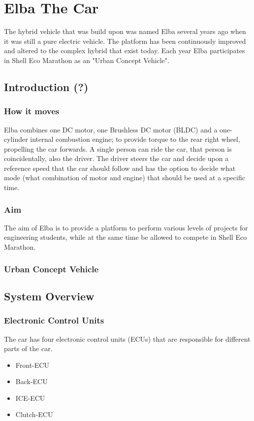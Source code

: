 \chapter{Elba The Car}
The hybrid vehicle that was build upon was named Elba several years ago when it was still a pure electric vehicle. The platform has been continuously improved and altered to the complex hybrid that exist today. Each year Elba participates in Shell Eco Marathon as an "Urban Concept Vehicle".

\section{Introduction (?)}
\subsection{How it moves}
Elba combines one DC motor, one Brushless DC motor (BLDC) and a one-cylinder internal combustion engine; to provide torque to the rear right wheel, propelling the car forwards.
A single person can ride the car, that person is coincidentally, also the driver. 
The driver steers the car and decide upon a reference speed that the car should follow and has the option to decide what mode (what combination of motor and engine) that should be used at a specific time.

\subsection{Aim}
The aim of Elba is to provide a platform to perform various levels of projects for engineering students, while at the same time be allowed to compete in Shell Eco Marathon.

\subsection{Urban Concept Vehicle}

\section{System Overview}
\subsection{Electronic Control Units}
The car has four electronic control units (ECUs) that are responsible for different parts of the car.

\begin{itemize}
\item Front-ECU
\item Back-ECU
\item ICE-ECU
\item Clutch-ECU
\end{itemize}

